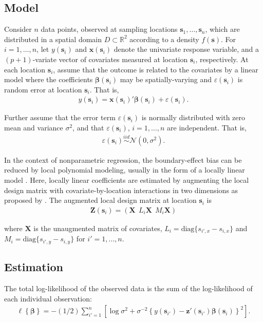 \documentclass[authoryear, review, 11pt]{elsarticle}
\begin{document}
	\subsection{Model}	
	Consider $n$ data points, observed at sampling locations $\bm{s}_1, \dots, \bm{s}_n$, which are distributed in a spatial domain $D \subset \mathbb{R}^2$ according to a density $f(\bm{s})$. For $i = 1, \dots, n$, let $y(\bm{s}_i)$ and $\bm{x}(\bm{s}_i)$ denote the univariate response variable, and a $(p+1)$-variate vector of covariates measured at location $\bm{s}_i$, respectively. At each location $\bm{s}_i$, assume that the outcome is related to the covariates by a linear model where the coefficients $\bm{\beta}(\bm{s}_i)$ may be spatially-varying and $\varepsilon(\bm{s}_i)$ is random error at location $\bm{s}_i$. That is,
	\begin{align}\label{eq:lm(s)}
		y(\bm{s}_i) = \bm{x}(\bm{s}_i)' \bm{\beta}(\bm{s}_i) + \varepsilon(\bm{s}_i).
	\end{align}
	
	Further assume that the error term $\varepsilon(\bm{s}_i)$ is normally distributed with zero mean and variance $\sigma^2$, and that $\varepsilon(\bm{s}_i)$, $i=1, \dots, n$ are independent. That is,
	\begin{align} \label{eq:err}
		\varepsilon(\bm{s}_i) \overset{iid}{\sim} \mathcal{N} \left( 0,\sigma^2 \right).
	\end{align}

  In the context of nonparametric regression, the boundary-effect bias can be reduced by local polynomial modeling, usually in the form of a locally linear model \citep{Fan-1996}. Here, locally linear coefficients are estimated by augmenting the local design matrix with covariate-by-location interactions in two dimensions as proposed by \cite{Wang:2008b}. The augmented local design matrix at location $\bm{s}_i$ is
  \begin{align}
		\bm{Z}(\bm{s}_i) = \left( \bm{X}  \:\: L_i \bm{X} \:\: M_i \bm{X} \right)
	\end{align} 
  
	where $\bm{X}$ is the unaugmented matrix of covariates, $L_i = \text{diag}\{s_{i',x} - s_{i,x}\}$ and $M_i = \text{diag}\{s_{i',y} - s_{i,y}\}$ for $i' = 1, \dots, n$.
  
  \subsection{Estimation}		
  The total log-likelihood of the observed data is the sum of the log-likelihood of each individual observation:
  \begin{align} \label{eq:coefficients}
  	\ell \left\{ \bm{\beta} \right\} = -(1/2) \sum_{i'=1}^n \left[ \log{ \sigma^2}  + \sigma^{-2}  \left\{ y(\bm{s}_{i'}) - \bm{z}'(\bm{s}_{i'}) \bm{\beta}(\bm{s}_i) \right\}^2 \right].
	\end{align}
	
\end{document}
